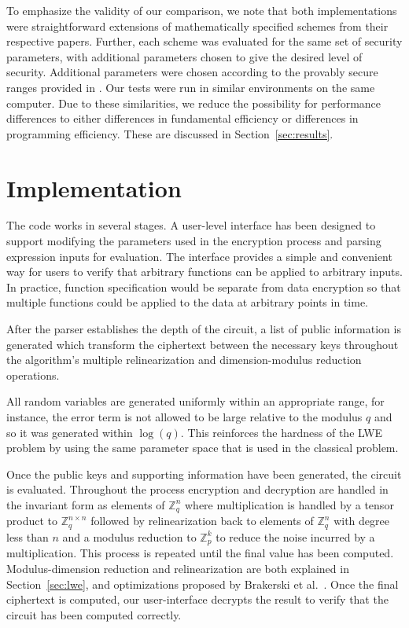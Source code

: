 \documentclass[letterpaper,twocolumn,10pt]{article}
\begin{document}
To emphasize the validity of our comparison, we note that both implementations were straightforward extensions of mathematically specified schemes from their respective papers. Further, each scheme was evaluated for the same set of security parameters, with additional parameters chosen to give the desired level of security. Additional parameters were chosen according to the provably secure ranges provided in \cite{StandardLWE, CNT}. Our tests were run in similar environments on the same computer. Due to these similarities, we reduce the possibility for performance differences to either differences in fundamental efficiency or differences in programming efficiency. These are discussed in Section~\ref{sec:results}.


\section{Implementation}
The code works in several stages. A user-level interface has been designed to support modifying the parameters used in the encryption process and parsing expression inputs for evaluation. The interface provides a simple and convenient way for users to verify that arbitrary functions can be applied to arbitrary inputs. In practice, function specification would be separate from data encryption so that multiple functions could be applied to the data at arbitrary points in time.

After the parser establishes the depth of the circuit, a list of public information is generated which transform the ciphertext between the necessary keys throughout the algorithm's multiple relinearization and dimension-modulus reduction operations.

All random variables are generated uniformly within an appropriate range, for instance, the error term is not allowed to be large relative to the modulus $q$ and so it was generated within $\log(q)$. This reinforces the hardness of the LWE problem by using the same parameter space that is used in the classical problem.

Once the public keys and supporting information have been generated, the circuit is evaluated. Throughout the process encryption and decryption are handled in the invariant form as elements of $\mathbb{Z}^n_q$ where multiplication is handled by a tensor product to $\mathbb{Z}^{n\times n}_q$ followed by relinearization back to elements of $\mathbb{Z}^n_q$ with degree less than $n$ and a modulus reduction to $\mathbb{Z}^k_p$ to reduce the noise incurred by a multiplication. This process is repeated until the final value has been computed. Modulus-dimension reduction and relinearization are both explained in Section~\ref{sec:lwe}, and optimizations proposed by Brakerski et al.~\cite{StandardLWE}. Once the final ciphertext is computed, our user-interface decrypts the result to verify that the circuit has been computed correctly.
\end{document}
